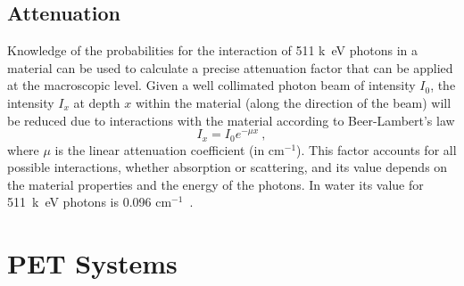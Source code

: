 \subsection{Attenuation}
Knowledge of the probabilities for the interaction of 511 \si{k\electronvolt} photons in a material can be used to calculate a precise attenuation factor that can be applied at the macroscopic level. Given a well collimated photon beam of intensity $I_0$, the intensity $I_x$ at depth $x$ within the material (along the direction of the beam) will be reduced due to interactions with the material according to Beer-Lambert's law
\begin{equation} \label{Attenuation}
I_x = I_0 e^{-\mu x} \ ,
\end{equation}
where $\mu$ is the linear attenuation coefficient (in cm$^{-1}$). This factor accounts for all possible interactions, whether absorption or scattering, and its value depends on the material properties and the energy of the photons. In water its value for 511~\si{k\electronvolt} photons is 0.096 cm$^{-1}$~\cite{Kinahan1998}.
%
%
%
\section{PET Systems}

